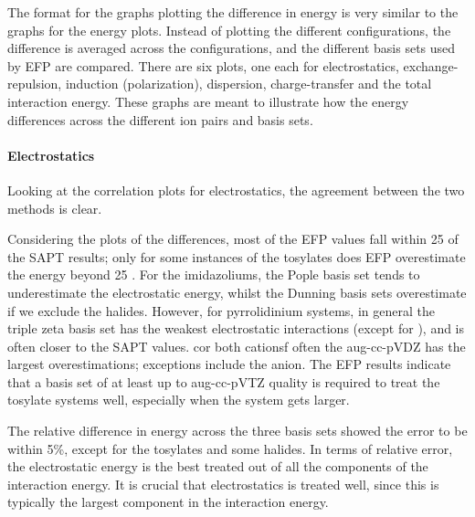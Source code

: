 The format for the graphs plotting the difference in energy is very similar to the graphs for the energy plots. 
Instead of plotting the different configurations, the difference is averaged across the configurations, and the different basis sets used by EFP are compared. 
There are six plots, one each for electrostatics, exchange-repulsion, induction (polarization), dispersion, charge-transfer and the total interaction energy.
These graphs are meant to illustrate how the energy differences across the different ion pairs and basis sets.







\paragraph{Electrostatics}
Looking at the correlation plots for electrostatics, the agreement between the two methods is clear.

Considering the plots of the differences, most of the EFP values fall within 25 \enUnit of the SAPT results; only for some instances of the tosylates does EFP overestimate the energy beyond 25 \enUnit. 
For the imidazoliums, the Pople basis set tends to underestimate the electrostatic energy, whilst the Dunning basis sets overestimate if we exclude the halides.
However, for pyrrolidinium systems, in general the triple zeta basis set has the weakest electrostatic interactions (except for \ntf), and is often closer to the SAPT values.
cor both cationsf often the aug-cc-pVDZ has the largest overestimations; exceptions include the \ntf anion. 
The EFP results indicate that a basis set of at least up to aug-cc-pVTZ quality is required to treat the tosylate systems well, especially when the system gets larger. 


The relative difference in energy across the three basis sets showed the error to be within 5\%, except for the tosylates and some halides.
In terms of relative error, the electrostatic energy is the best treated out of all the components of the interaction energy.
It is crucial that electrostatics is treated well, since this is typically the largest component in the interaction energy. 


